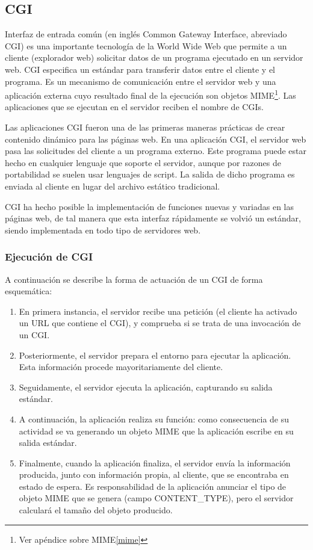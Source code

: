 \documentclass[a4paper]{report}
\begin{document}
\subsection{CGI}
Interfaz de entrada común (en inglés Common Gateway Interface, abreviado CGI) es
una importante tecnología de la World Wide Web que permite a un cliente
(explorador web) solicitar datos de un programa ejecutado en un servidor web.
CGI especifica un estándar para transferir datos entre el cliente y el programa.
Es un mecanismo de comunicación entre el servidor web y una aplicación externa
cuyo resultado final de la ejecución son objetos MIME\footnote{Ver apéndice sobre MIME\ref{mime}}.
Las aplicaciones que se ejecutan en el servidor reciben el nombre de CGIs.


Las aplicaciones CGI fueron una de las primeras maneras prácticas de crear
contenido dinámico para las páginas web. En una aplicación CGI, el servidor web
pasa las solicitudes del cliente a un programa externo. Este programa puede
estar hecho en cualquier lenguaje que soporte el servidor, aunque por razones de
portabilidad se suelen usar lenguajes de script. La salida de dicho programa es
enviada al cliente en lugar del archivo estático tradicional.

CGI ha hecho posible la implementación de funciones nuevas y variadas en las
páginas web, de tal manera que esta interfaz rápidamente se volvió un estándar,
siendo implementada en todo tipo de servidores web.
\subsubsection*{Ejecución de CGI}

A continuación se describe la forma de actuación de un CGI de forma esquemática:
\begin{enumerate}
  \item{En primera instancia, el servidor recibe una petición (el cliente ha
activado un URL que contiene el CGI), y comprueba si se trata de una invocación
de un CGI.}
  \item{Posteriormente, el servidor prepara el entorno para ejecutar la
aplicación. Esta información procede mayoritariamente del cliente.}
  \item{Seguidamente, el servidor ejecuta la aplicación, capturando su salida
estándar.}
  \item{A continuación, la aplicación realiza su función: como consecuencia de
su actividad se va generando un objeto MIME que la aplicación escribe en su
salida estándar.}
  \item{Finalmente, cuando la aplicación finaliza, el servidor envía la
información producida, junto con información propia, al cliente, que se
encontraba en estado de espera.
Es responsabilidad de la aplicación anunciar el
tipo de objeto MIME que se genera (campo CONTENT\_TYPE), pero el servidor
calculará el tamaño del objeto producido.}
\end{enumerate}
\end{document}
